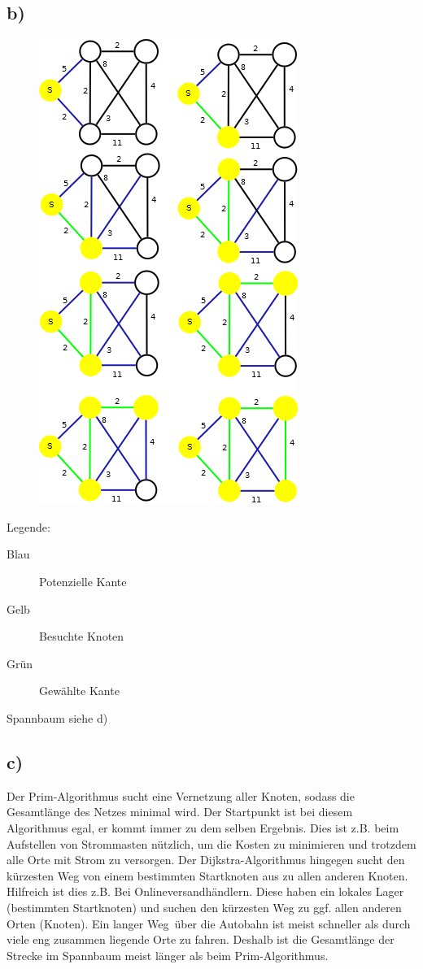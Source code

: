 \documentclass[a4paper,11pt,twoside]{scrartcl}
\begin{document}
\subsection*{b)} 
\begin{figure}[H]
	\centering
	\includegraphics*[scale=0.68]{Bilder/2b_Prim}
\end{figure}
\vspace{-30pt}
Legende:
\begin{description}
	\item[Blau] Potenzielle Kante
	\item[Gelb] Besuchte Knoten
	\item[Grün] Gewählte Kante
\end{description}
Spannbaum siehe d)
\subsection*{c)}
Der Prim-Algorithmus sucht eine Vernetzung aller Knoten, sodass die Gesamtlänge des Netzes minimal wird. Der Startpunkt ist bei diesem Algorithmus egal, er kommt immer zu dem selben Ergebnis. Dies ist z.B. beim Aufstellen von Strommasten nützlich, um die Kosten zu minimieren und trotzdem alle Orte mit Strom zu versorgen.
Der Dijkstra-Algorithmus hingegen sucht den kürzesten Weg von einem bestimmten Startknoten aus zu allen anderen Knoten. Hilfreich ist dies z.B. Bei Onlineversandhändlern. Diese haben ein lokales Lager (bestimmten Startknoten) und suchen den kürzesten Weg zu ggf. allen anderen Orten (Knoten). Ein \glqq langer Weg\grqq ~über die Autobahn ist meist schneller als durch viele eng zusammen liegende Orte zu fahren. Deshalb ist die Gesamtlänge der Strecke im Spannbaum meist länger als beim Prim-Algorithmus.
\end{document}
